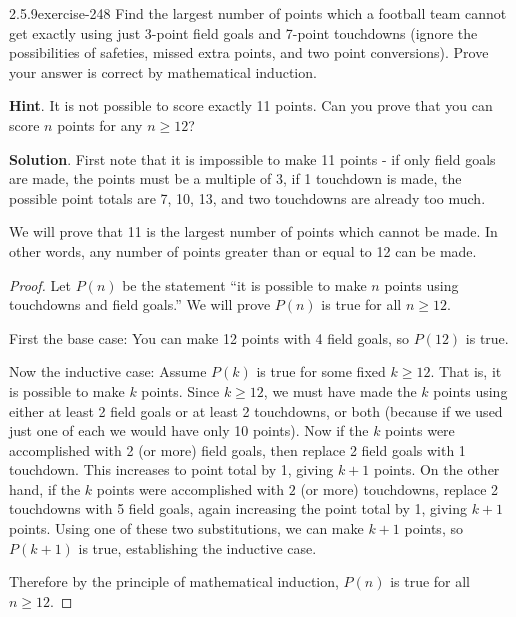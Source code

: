 \documentclass[twoside,11pt,]{book}
\numberwithin{equation}{chapter}
\begin{document}
\begin{divisionsolution}{2.5.9}{}{exercise-248}%
\hypertarget{p-3614}{}%
Find the largest number of points which a football team cannot get exactly using just 3-point field goals and 7-point touchdowns (ignore the possibilities of safeties, missed extra points, and two point conversions). Prove your answer is correct by mathematical induction.%
\par\smallskip%
\noindent\textbf{Hint}.\quad%
\hypertarget{p-3615}{}%
It is not possible to score exactly 11 points.  Can you prove that you can score \(n\) points for any \(n \ge 12\)?%
\par\smallskip%
\noindent\textbf{Solution}.\quad%
\hypertarget{p-3616}{}%
First note that it is impossible to make 11 points - if only field goals are made, the points must be a multiple of 3, if 1 touchdown is made, the possible point totals are 7, 10, 13, \textellipsis{} and two touchdowns are already too much.%
\par
\hypertarget{p-3617}{}%
We will prove that 11 is the largest number of points which cannot be made. In other words, any number of points greater than or equal to 12 can be made.%
\begin{proof}{}
\hypertarget{p-3618}{}%
Let \(P(n)\) be the statement ``it is possible to make \(n\) points using touchdowns and field goals.'' We will prove \(P(n)\) is true for all \(n \ge 12\).%
\par
\hypertarget{p-3619}{}%
First the base case: You can make 12 points with 4 field goals, so \(P(12)\) is true.%
\par
\hypertarget{p-3620}{}%
Now the inductive case: Assume \(P(k)\) is true for some fixed \(k \ge 12\). That is, it is possible to make \(k\) points. Since \(k \ge 12\), we must have made the \(k\) points using either at least 2 field goals or at least 2 touchdowns, or both (because if we used just one of each we would have only 10 points). Now if the \(k\) points were accomplished with 2 (or more) field goals, then replace 2 field goals with 1 touchdown. This increases to point total by 1, giving \(k + 1\) points. On the other hand, if the \(k\) points were accomplished with \(2\) (or more) touchdowns, replace 2 touchdowns with 5 field goals, again increasing the point total by 1, giving \(k+1\) points. Using one of these two substitutions, we can make \(k+1\) points, so \(P(k+1)\) is true, establishing the inductive case.%
\par
\hypertarget{p-3621}{}%
Therefore by the principle of mathematical induction, \(P(n)\) is true for all \(n \ge 12\).%
\end{proof}
\end{divisionsolution}%
\end{document}
